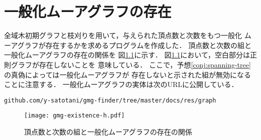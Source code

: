 
\chapter{一般化ムーアグラフの存在}
\label{chap:list-of-gmg}
全域木初期グラフと枝刈りを用いて，与えられた頂点数と次数をもつ一般化
ムーアグラフが存在するかを求めるプログラムを作成した．
頂点数と次数の組と一般化ムーアグラフの存在の関係を
図\ref{fig:gmg-existence}に示す．
図\ref{fig:gmg-existence}において，空白部分は正則グラフが存在しないことを
意味している．
ここで，予想\ref{conj:spanning-tree}の真偽によっては一般化ムーアグラフが
存在しないと示された組が無効になることに注意する．
一般化ムーアグラフの実体は次のURLに公開している．
\begin{verbatim}
github.com/y-satotani/gmg-finder/tree/master/docs/res/graph
\end{verbatim}

\begin{figure}[htbp]
  \centering
  \captionsetup{justification=centering}
  \texttt{[image: gmg-existence-h.pdf]}
  \caption{頂点数と次数の組と一般化ムーアグラフの存在の関係}
  \label{fig:gmg-existence}
\end{figure}
